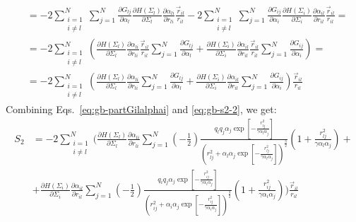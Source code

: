 \documentclass[11pt]{book}
\begin{document}
\begin{equation}
\begin{split}
&=-2\sum_{\substack{i=1\\i\ne l}}^{N}\sum_{j=1}^{N}\frac{\partial G_{lj}}{\partial \alpha_{l}}\frac{\partial H(\Sigma_{l})}{\partial \Sigma_{l}}\frac{\partial \alpha_{li}}{\partial r_{li}}\frac{\vec{r}_{il}}{r_{il}}-2\sum_{\substack{i=1\\i\ne l}}^{N}\sum_{j=1}^{N}\frac{\partial G_{ij}}{\partial \alpha_{i}}\frac{\partial H(\Sigma_{i})}{\partial \Sigma_{i}}\frac{\partial \alpha_{il}}{\partial r_{il}}\frac{\vec{r}_{il}}{r_{il}}=\\
&=-2\sum_{\substack{i=1\\i\ne l}}^{N}\left(\frac{\partial H(\Sigma_{l})}{\partial \Sigma_{l}}\frac{\partial \alpha_{li}}{\partial r_{li}}\frac{\vec{r}_{il}}{r_{il}}\sum_{j=1}^{N}\frac{\partial G_{lj}}{\partial \alpha_{l}}+\frac{\partial H(\Sigma_{i})}{\partial \Sigma_{i}}\frac{\partial \alpha_{il}}{\partial r_{il}}\frac{\vec{r}_{il}}{r_{il}}\sum_{j=1}^{N}\frac{\partial G_{ij}}{\partial \alpha_{i}}\right)=\\
&=-2\sum_{\substack{i=1\\i\ne l}}^{N}\left(\frac{\partial H(\Sigma_{l})}{\partial \Sigma_{l}}\frac{\partial \alpha_{li}}{\partial r_{li}}\sum_{j=1}^{N}\frac{\partial G_{lj}}{\partial \alpha_{l}}+\frac{\partial H(\Sigma_{i})}{\partial \Sigma_{i}}\frac{\partial \alpha_{il}}{\partial r_{il}}\sum_{j=1}^{N}\frac{\partial G_{ij}}{\partial \alpha_{i}}\right)\frac{\vec{r}_{il}}{r_{il}}
\end{split}
\end{equation}
Combining Eqs.~\ref{eq:gb-partGilalphai} and \ref{eq:gb-s2-2}, we get:
\begin{equation}\label{eq:gb-s2-3.5}
\begin{split}
S_{2}&=-2\sum_{\substack{i=1\\i\ne l}}^{N}\Bigg(\frac{\partial H(\Sigma_{l})}{\partial \Sigma_{l}}\frac{\partial \alpha_{li}}{\partial r_{li}}\sum_{j=1}^{N} \left(-\frac{1}{2}\right)\frac{q_{l}q_{j}\alpha_{j}\exp{\left[-\frac{r_{lj}^{2}}{\gamma\alpha_{l}\alpha_{j}}\right]}}{\left(r_{lj}^{2}+\alpha_{l}\alpha_{j}\exp{\left[-\frac{r_{lj}^{2}}{\gamma\alpha_{l}\alpha_{j}}\right]}\right)^{\frac{3}{2}}}\left(1+\frac{r_{lj}^{2}}{\gamma\alpha_{l}\alpha_{j}}\right)+\\
&+\frac{\partial H(\Sigma_{i})}{\partial \Sigma_{i}}\frac{\partial \alpha_{il}}{\partial r_{il}}\sum_{j=1}^{N}\left(-\frac{1}{2}\right)\frac{q_{i}q_{j}\alpha_{j}\exp{\left[-\frac{r_{ij}^{2}}{\gamma\alpha_{i}\alpha_{j}}\right]}}{\left(r_{ij}^{2}+\alpha_{i}\alpha_{j}\exp{\left[-\frac{r_{ij}^{2}}{\gamma\alpha_{i}\alpha_{j}}\right]}\right)^{\frac{3}{2}}}\left(1+\frac{r_{ij}^{2}}{\gamma\alpha_{i}\alpha_{j}}\right)\Bigg)\frac{\vec{r}_{il}}{r_{il}}\\
\end{split}
\end{equation}
\end{document}
